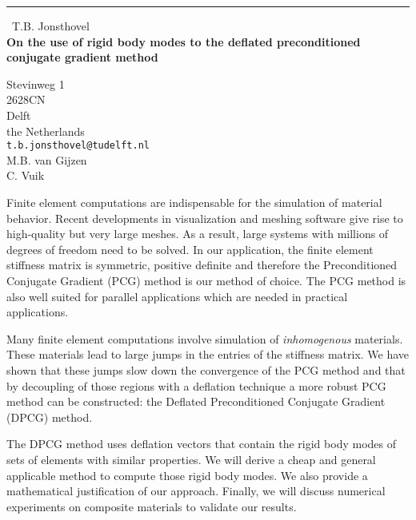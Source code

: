 \documentclass{report}
\begin{document}
\begin{center}
\rule{6in}{1pt} \
{\large T.B. Jonsthovel \\
{\bf On the use of rigid body modes to the deflated preconditioned conjugate gradient method}}

Stevinweg 1 \\ 2628CN \\ Delft \\ the Netherlands
\\
{\tt t.b.jonsthovel@tudelft.nl}\\
M.B. van Gijzen\\
C. Vuik\end{center}

Finite element computations are indispensable for the simulation of
material behavior. Recent developments in visualization and meshing
software give rise to high-quality but very large meshes. As a result,
large systems with millions of degrees of freedom need to be solved. In
our application, the finite element stiffness matrix is symmetric,
positive definite and therefore the Preconditioned Conjugate Gradient
(PCG) method is our method of choice. The PCG method is also well suited
for parallel applications which are needed in practical applications.

Many finite element computations involve simulation of {\it inhomogenous}
materials. These materials lead to large jumps in the entries of the
stiffness matrix. We have shown that these jumps slow down the
convergence of the PCG method and that by decoupling of those regions
with a deflation technique a more robust PCG method can be constructed:
the Deflated Preconditioned Conjugate Gradient (DPCG) method.

The DPCG method uses deflation vectors that contain the rigid body modes
of sets of elements with similar properties. We will derive a cheap and
general applicable method to compute those rigid body modes. We also
provide a mathematical justification of our approach. Finally, we will
discuss numerical experiments on composite materials to validate our
results.
\end{document}
